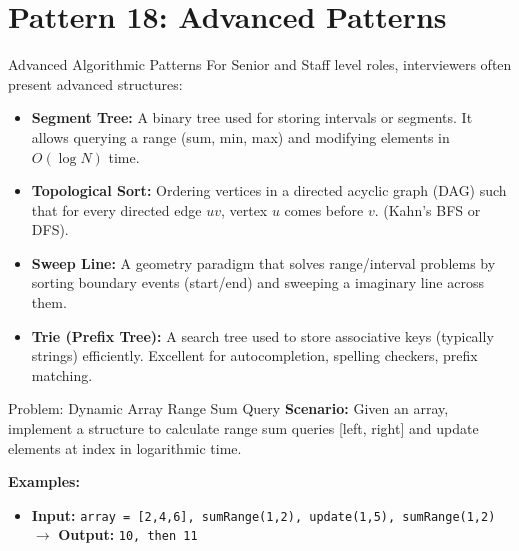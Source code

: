 \section{Pattern 18: Advanced Patterns}

\begin{frame}[c]{\empty}
    \begin{center}
        \Large\textbf{\secname}
    \end{center}
\end{frame}

\begin{frame}{Advanced Algorithmic Patterns}
  For Senior and Staff level roles, interviewers often present advanced structures:
  \begin{itemize}
    \item \textbf{Segment Tree:} A binary tree used for storing intervals or segments. It allows querying a range (sum, min, max) and modifying elements in $O(\log N)$ time.
    \item \textbf{Topological Sort:} Ordering vertices in a directed acyclic graph (DAG) such that for every directed edge $uv$, vertex $u$ comes before $v$. (Kahn's BFS or DFS).
    \item \textbf{Sweep Line:} A geometry paradigm that solves range/interval problems by sorting boundary events (start/end) and sweeping a imaginary line across them.
    \item \textbf{Trie (Prefix Tree):} A search tree used to store associative keys (typically strings) efficiently. Excellent for autocompletion, spelling checkers, prefix matching.
  \end{itemize}
\end{frame}

\begin{frame}[fragile]{Problem: Dynamic Array Range Sum Query}
  \textbf{Scenario:}
  Given an array, implement a structure to calculate range sum queries [left, right] and update elements at index in logarithmic time.
  
  \vspace{0.3cm}
  \textbf{Examples:}
  \begin{itemize}
    \item \textbf{Input:} \texttt{array = [2,4,6], sumRange(1,2), update(1,5), sumRange(1,2)} $\rightarrow$ \textbf{Output:} \texttt{10, then 11}
  \end{itemize}
\end{frame}

